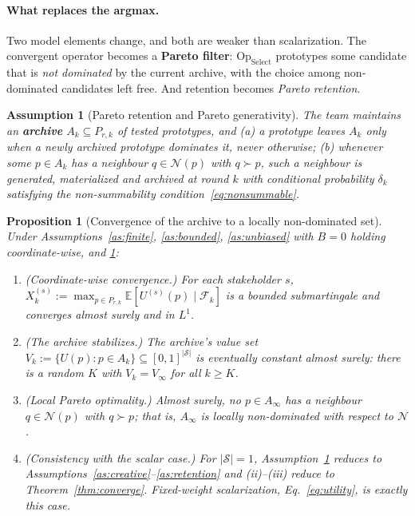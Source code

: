 \documentclass[11pt]{article}
\newtheorem{proposition}{Proposition}
\newtheorem{assumption}{Assumption}
\newcommand{\E}{\mathbb{E}}
\newcommand{\filt}{\mathcal{F}}     %
\newcommand{\Op}[1]{\mathrm{Op}_{\mathrm{#1}}}
\begin{document}
\paragraph{What replaces the argmax.} Two model elements change, and both are weaker than scalarization. The convergent operator becomes a \textbf{Pareto filter}: $\Op{Select}$ prototypes some candidate that is \emph{not dominated} by the current archive, with the choice among non-dominated candidates left free. And retention becomes \emph{Pareto retention}.

\begin{assumption}[Pareto retention and Pareto generativity]
\label{as:pareto}
The team maintains an \textbf{archive} $A_k\subseteq P_{r,k}$ of tested prototypes, and (a) a prototype leaves $A_k$ only when a newly archived prototype dominates it, never otherwise; (b) whenever some $p\in A_k$ has a neighbour $q\in\mathcal{N}(p)$ with $q\succ p$, such a neighbour is generated, materialized and archived at round $k$ with conditional probability $\delta_k$ satisfying the non-summability condition~\eqref{eq:nonsummable}.
\end{assumption}

\begin{proposition}[Convergence of the archive to a locally non-dominated set]
\label{prop:pareto}
Under Assumptions~\textup{\ref{as:finite}}, \textup{\ref{as:bounded}}, \textup{\ref{as:unbiased}} with $B=0$ holding coordinate-wise, and \textup{\ref{as:pareto}}:
\begin{enumerate}[label=(\roman*)]
\item \emph{(Coordinate-wise convergence.)} For each stakeholder $s$, $X_k^{(s)}:=\max_{p\in P_{r,k}}\E[U^{(s)}(p)\mid\filt_k]$ is a bounded submartingale and converges almost surely and in $L^1$.
\item \emph{(The archive stabilizes.)} The archive's value set $V_k:=\{U(p):p\in A_k\}\subseteq[0,1]^{|\mathcal S|}$ is eventually constant almost surely: there is a random $K$ with $V_k=V_\infty$ for all $k\ge K$.
\item \emph{(Local Pareto optimality.)} Almost surely, no $p\in A_\infty$ has a neighbour $q\in\mathcal{N}(p)$ with $q\succ p$; that is, $A_\infty$ is \emph{locally non-dominated} with respect to $\mathcal{N}$.
\item \emph{(Consistency with the scalar case.)} For $|\mathcal S|=1$, Assumption~\ref{as:pareto} reduces to Assumptions~\ref{as:creative}--\ref{as:retention} and (ii)--(iii) reduce to Theorem~\ref{thm:converge}. Fixed-weight scalarization, Eq.~\eqref{eq:utility}, is exactly this case.
\end{enumerate}
\end{proposition}
\end{document}
